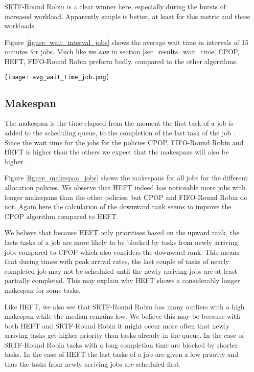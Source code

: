 \documentclass[twocolumn,a4]{scrartcl}
\begin{document}
SRTF-Round Robin is a clear winner here, especially during the bursts of increased workload. Apparently simple is better, at least for this metric and these workloads.

Figure \ref{figure_wait_interval_jobs} shows the average wait time in intervals of 15 minutes for jobs. Much like we saw in section \ref{sec_results_wait_time} CPOP, HEFT, FIFO-Round Robin preform badly, compared to the other algorithms.

\begin{figure*}[p]
    \centering
  \texttt{[image: avg\_wait\_time\_job.png]}
    \caption{Wait time for jobs in intervals of 15 minutes in workload 1 (top) and workload 2 (bottom), using setup 1 (left) and setup 2 (right)}
    \label{figure_wait_interval_jobs}
\end{figure*}


\subsection{Makespan} \label{sec_results_makespan}

The makespan is the time elapsed from the moment the first task of a job is added to the scheduling queue, to the completion of the last task of the job \cite{DBLP:conf/sc/AndreadisVMI18}. Since the wait time for the jobs for the policies CPOP, FIFO-Round Robin and HEFT is higher than the others we expect that the makespans will also be higher.

Figure \ref{figure_makespan_jobs} shows the makespans for all jobs for the different allocation policies. We observe that HEFT indeed has noticeable more jobs with longer makespans than the other policies, but CPOP and FIFO-Round Robin do not. Again here the calculation of the downward rank seems to improve the CPOP algorithm compared to HEFT.

We believe that because HEFT only prioritises based on the upward rank, the lasts tasks of a job are more likely to be blocked by tasks from newly arriving jobs compared to CPOP which also considers the downward rank. This means that during times with peak arrival rates, the last couple of tasks of nearly completed job may not be scheduled until the newly arriving jobs are at least partially completed. This may explain why HEFT shows a considerably longer makespan for some tasks.

Like HEFT, we also see that SRTF-Round Robin has many outliers with a high makespan while the median remains low. We believe this may be because with both HEFT and SRTF-Round Robin it might occur more often that newly arriving tasks get higher priority than tasks already in the queue. In the case of SRTF-Round Robin tasks with a long completion time are blocked by shorter tasks. In the case of HEFT the last tasks of a job are given a low priority and thus the tasks from newly arriving jobs are scheduled first.
\end{document}
